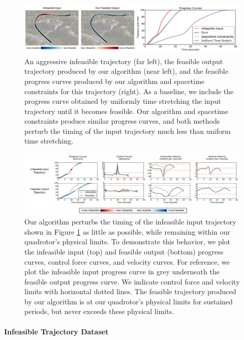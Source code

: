 \begin{figure}[t]
\centering
\includegraphics[width=6.0in]{images/2016_siggraph/05_easing_curve_comparison.pdf}
\caption{
An aggressive infeasible trajectory (far left), the feasible output trajectory produced by our algorithm (near left), and the feasible progress curves produced by our algorithm and spacetime constraints for this trajectory (right).
As a baseline, we include the progress curve obtained by uniformly time stretching the input trajectory until it becomes feasible. Our algorithm and spacetime constraints produce similar progress curves, and both methods perturb the timing of the input trajectory much less than uniform time stretching.
}
\label{fig:ch3:easing}
\end{figure}

\begin{figure}[t!]
\centering
\includegraphics[width=6.0in]{images/2016_siggraph/06_easing_curve_comparison_3.pdf}
\caption{
Our algorithm perturbs the timing of the infeasible input trajectory shown in Figure \ref{fig:ch3:easing} as little as possible, while remaining within our quadrotor's physical limits.
To demonstrate this behavior, we plot the infeasible input (top) and feasible output (bottom) progress curves, control force curves, and velocity curves.
For reference, we plot the infeasible input progress curve in grey underneath the feasible output progress curve.
We indicate control force and velocity limits  with horizontal dotted lines.
The feasible trajectory produced by our algorithm is at our quadrotor's physical limits for sustained periods, but never exceeds these physical limits.
}
\label{fig:ch3:limits}
\end{figure}

\paragraph{Infeasible Trajectory Dataset}

